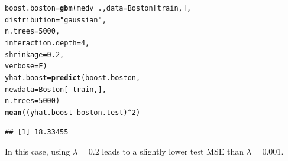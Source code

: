 \documentclass[12pt]{article}\usepackage[]{graphicx}\usepackage[]{color}
\makeatletter
\newcommand{\hlnum}[1]{\textcolor[rgb]{0.686,0.059,0.569}{#1}}%
\newcommand{\hlstr}[1]{\textcolor[rgb]{0.192,0.494,0.8}{#1}}%
\newcommand{\hlopt}[1]{\textcolor[rgb]{0,0,0}{#1}}%
\newcommand{\hlstd}[1]{\textcolor[rgb]{0.345,0.345,0.345}{#1}}%
\newcommand{\hlkwb}[1]{\textcolor[rgb]{0.69,0.353,0.396}{#1}}%
\newcommand{\hlkwc}[1]{\textcolor[rgb]{0.333,0.667,0.333}{#1}}%
\newcommand{\hlkwd}[1]{\textcolor[rgb]{0.737,0.353,0.396}{\textbf{#1}}}%
\newenvironment{kframe}{%
 \def\at@end@of@kframe{}%
 \ifinner\ifhmode%
  \def\at@end@of@kframe{\end{minipage}}%
  \begin{minipage}{\columnwidth}%
 \fi\fi%
 \def\FrameCommand##1{\hskip\@totalleftmargin \hskip-\fboxsep
 \colorbox{shadecolor}{##1}\hskip-\fboxsep
     \hskip-\linewidth \hskip-\@totalleftmargin \hskip\columnwidth}%
 \MakeFramed {\advance\hsize-\width
   \@totalleftmargin\z@ \linewidth\hsize
   \@setminipage}}%
 {\par\unskip\endMakeFramed%
 \at@end@of@kframe}
\newenvironment{knitrout}{}{} %
\makeatother
\begin{document}
\begin{knitrout}
\color{fgcolor}\begin{kframe}
\begin{alltt}
\hlstd{boost.boston} \hlkwb{=} \hlkwd{gbm}\hlstd{(medv}\hlopt{~}\hlstd{.,} \hlkwc{data} \hlstd{= Boston[train,],}
                   \hlkwc{distribution}\hlstd{=}\hlstr{"gaussian"}\hlstd{,}
                   \hlkwc{n.trees}\hlstd{=}\hlnum{5000}\hlstd{,}
                   \hlkwc{interaction.depth}\hlstd{=}\hlnum{4}\hlstd{,}
                   \hlkwc{shrinkage}\hlstd{=}\hlnum{0.2}\hlstd{,}
                   \hlkwc{verbose}\hlstd{=F)}
\hlstd{yhat.boost} \hlkwb{=} \hlkwd{predict}\hlstd{(boost.boston,}
                     \hlkwc{newdata}\hlstd{=Boston[}\hlopt{-}\hlstd{train,],}
                     \hlkwc{n.trees}\hlstd{=}\hlnum{5000}\hlstd{)}
\hlkwd{mean}\hlstd{((yhat.boost}\hlopt{-}\hlstd{boston.test)}\hlopt{^}\hlnum{2}\hlstd{)}
\end{alltt}
\begin{verbatim}
## [1] 18.33455
\end{verbatim}
\end{kframe}
\end{knitrout}

In this case, using $\lambda = 0.2$ leads to a slightly lower test MSE than $\lambda = 0.001$.
\end{document}
